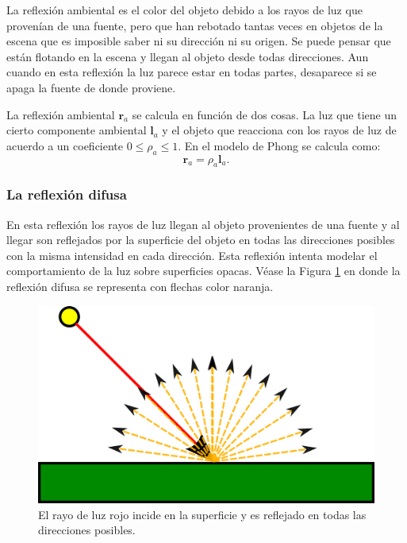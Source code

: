 La reflexión ambiental es el color del objeto debido a los rayos de luz que provenían de una fuente, pero que han rebotado tantas veces en objetos de la escena que es imposible saber ni su dirección ni su origen. Se puede pensar que están flotando en la escena y llegan al objeto desde todas direcciones. Aun cuando en esta reflexión la luz parece estar en todas partes, desaparece si se apaga la fuente de donde proviene.

La reflexión ambiental $\textbf{r}_a$ se calcula en función de dos cosas. La luz que tiene un cierto componente ambiental $\textbf{l}_a$ y el objeto que reacciona con los rayos de luz de acuerdo a un coeficiente $0 \leq \rho_a \leq 1$. En el modelo de Phong se calcula como:
\begin{equation}
\textbf{r}_a = \rho_a \textbf{l}_a
\label{ec:refAmbiente}.
\end{equation}

\subsubsection{La reflexión difusa}

En esta reflexión los rayos de luz llegan al objeto provenientes de una fuente y al llegar son reflejados por la superficie del objeto en todas las direcciones posibles con la misma intensidad en cada dirección. Esta reflexión intenta modelar el comportamiento de la luz sobre superficies opacas. Véase la Figura \ref{fig:refDifusa} en donde la reflexión difusa se representa con flechas color naranja.

\begin{figure}[htp]
 \centering
  \includegraphics[scale=1.0]{img/cap01/difusa}
  \caption[Reflexión difusa]{El rayo de luz rojo incide en la superficie y es reflejado en todas las direcciones posibles.}
  \label{fig:refDifusa}
\end{figure}

